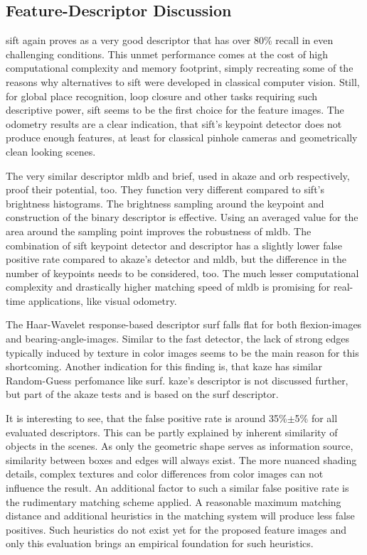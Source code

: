 \subsection{Feature-Descriptor Discussion}

\acrshort{sift} again proves as a very good descriptor that has over 80\% recall in even challenging conditions.
This unmet performance comes at the cost of high computational complexity and memory footprint, simply recreating some of the reasons why alternatives to \acrshort{sift} were developed in classical computer vision.
Still, for global place recognition, loop closure and other tasks requiring such descriptive power, \acrshort{sift} seems to be the first choice for the feature images.
The odometry results are a clear indication, that \acrshort{sift}'s keypoint detector does not produce enough features, at least for classical pinhole cameras and geometrically clean looking scenes.

The very similar descriptor \acrshort{mldb} and \acrshort{brief}, used in \acrshort{akaze} and \acrshort{orb} respectively, proof their potential, too.
They function very different compared to \acrshort{sift}'s brightness histograms.
The brightness sampling around the keypoint and construction of the binary descriptor is effective.
Using an averaged value for the area around the sampling point improves the robustness of \acrshort{mldb}.
The combination of \acrshort{sift} keypoint detector and descriptor has a slightly lower false positive rate compared to \acrshort{akaze}'s detector and \acrshort{mldb}, but the difference in the number of keypoints needs to be considered, too.
The much lesser computational complexity and drastically higher matching speed of \acrshort{mldb} is promising for real-time applications, like visual odometry.

The Haar-Wavelet response-based descriptor \acrshort{surf} falls flat for both \glspl{flexion-image} and \glspl{bearing-angle-image}.
Similar to the \acrshort{fast} detector, the lack of strong edges typically induced by texture in color images seems to be the main reason for this shortcoming.
Another indication for this finding is, that \acrshort{kaze} has similar Random-Guess perfomance like \acrshort{surf}.
\acrshort{kaze}'s descriptor is not discussed further, but part of the \acrshort{akaze} tests and is based on the \acrshort{surf} descriptor.

It is interesting to see, that the false positive rate is around 35\%$\pm$5\% for all evaluated descriptors.
This can be partly explained by inherent similarity of objects in the scenes.
As only the geometric shape serves as information source, similarity between boxes and edges will always exist.
The more nuanced shading details, complex textures and color differences from color images can not influence the result.
An additional factor to such a similar false positive rate is the rudimentary matching scheme applied.
A reasonable maximum matching distance and additional heuristics in the matching system will produce less false positives.
Such heuristics do not exist yet for the proposed feature images and only this evaluation brings an empirical foundation for such heuristics.
